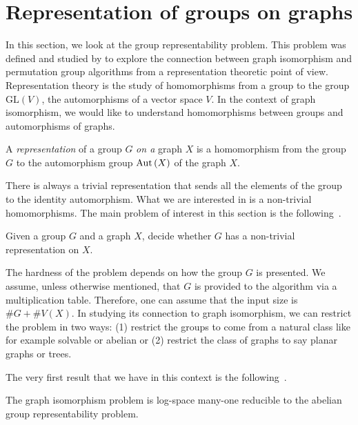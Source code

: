 \documentclass{article}
\begin{document}
\section{Representation of groups on graphs}

In this section, we look at the group representability problem. This
problem was defined and studied by \citet{kurur09} to explore the
connection between graph isomorphism and permutation group algorithms
from a representation theoretic point of view. Representation theory
is the study of homomorphisms from a group to the group
$\mathrm{GL}(V)$, the automorphisms of a vector space $V$. In the
context of graph isomorphism, we would like to understand
homomorphisms between groups and automorphisms of graphs.

\begin{definition}
  A \emph{representation} of a group $G$ \emph{on a} graph $X$ is a
  homomorphism from the group $G$ to the automorphism group $\mathrm{Aut}\left(X\right)$
  of the graph $X$. 
\end{definition}

There is always a trivial representation that sends all the elements
of the group to the identity automorphism. What we are interested in
is a non-trivial homomorphisms. The main problem of interest in this
section is the following~\cite{kurur09}.

\begin{problem}
  Given a group $G$ and a graph $X$, decide whether $G$ has a
  non-trivial representation on $X$.
\end{problem}

The hardness of the problem depends on how the group $G$ is
presented. We assume, unless otherwise mentioned, that $G$ is provided
to the algorithm via a multiplication table. Therefore, one can assume
that the input size is $\# G + \# V(X)$. In studying its connection to
graph isomorphism, we can restrict the problem in two ways: (1)
restrict the groups to come from a natural class like for example
solvable or abelian or (2) restrict the class of graphs to say planar
graphs or trees.

The very first result that we have in this context is the
following~\cite{kurur09}.

\begin{lemma}
  The graph isomorphism problem is log-space many-one reducible to the
  abelian group representability problem.
\end{lemma}
\end{document}
